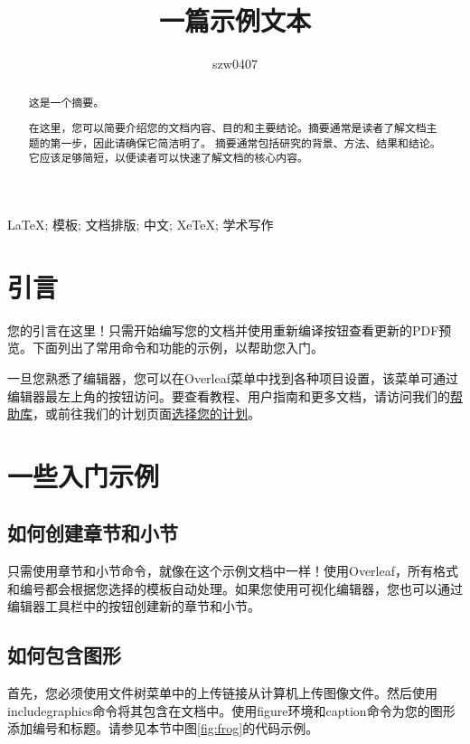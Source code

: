 \documentclass{article}
\title{一篇示例文本}
\author{szw0407}
\begin{document}
\maketitle

\begin{abstract}
      这是一个摘要。

      在这里，您可以简要介绍您的文档内容、目的和主要结论。摘要通常是读者了解文档主题的第一步，因此请确保它简洁明了。
      摘要通常包括研究的背景、方法、结果和结论。它应该足够简短，以便读者可以快速了解文档的核心内容。
\end{abstract}

\begin{keywords}
      LaTeX; 模板; 文档排版; 中文; XeTeX; 学术写作
\end{keywords}


\tableofcontents
\newpage
\section{引言}

您的引言在这里！只需开始编写您的文档并使用重新编译按钮查看更新的PDF预览。下面列出了常用命令和功能的示例，以帮助您入门。

一旦您熟悉了编辑器，您可以在Overleaf菜单中找到各种项目设置，该菜单可通过编辑器最左上角的按钮访问。要查看教程、用户指南和更多文档，请访问我们的\href{https://www.overleaf.com/learn}{帮助库}，或前往我们的计划页面\href{https://www.overleaf.com/user/subscription/plans}{选择您的计划}。

\section{一些入门示例}

\subsection{如何创建章节和小节}

只需使用章节和小节命令，就像在这个示例文档中一样！使用Overleaf，所有格式和编号都会根据您选择的模板自动处理。如果您使用可视化编辑器，您也可以通过编辑器工具栏中的按钮创建新的章节和小节。

\subsection{如何包含图形}

首先，您必须使用文件树菜单中的上传链接从计算机上传图像文件。然后使用includegraphics命令将其包含在文档中。使用figure环境和caption命令为您的图形添加编号和标题。请参见本节中图\ref{fig:frog}的代码示例。
\end{document}
